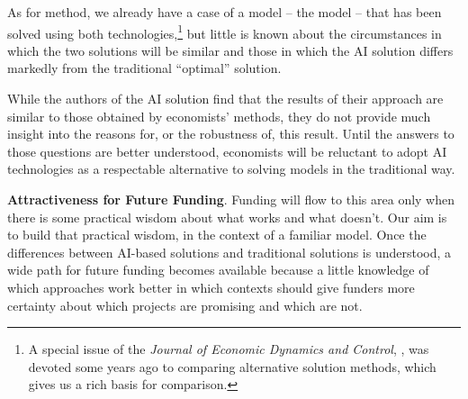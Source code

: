 \documentclass[11pt,pdftex,letterpaper]{article}
\begin{document}
      As for method, we already have a case of a model -- the \cite{KrusellSmith} model -- that has been solved using both technologies,\footnote{A special issue of the \textit{Journal of Economic Dynamics and Control}, \cite{JEDCspecial}, was devoted some years ago to comparing alternative solution methods, which gives us a rich basis for comparison.} but little is known about the circumstances in which the two solutions will be similar and those in which the AI solution differs markedly from the traditional ``optimal'' solution.

     While the authors of the AI solution find that the results of their approach are similar to those obtained by economists' methods, they do not provide much insight into the reasons for, or the robustness of, this result. Until the answers to those questions are better understood, economists will be reluctant to adopt AI technologies as a respectable alternative to solving models in the traditional way.

      \textbf{Attractiveness for Future Funding}. Funding will flow to this area only when there is some practical wisdom about what works and what doesn't. Our aim is to build that practical wisdom, in the context of a familiar model. Once the differences between AI-based solutions and traditional solutions is understood, a wide path for future funding becomes available because a little knowledge of which approaches work better in which contexts should give funders more certainty about which projects are promising and which are not.
      
\end{document}
